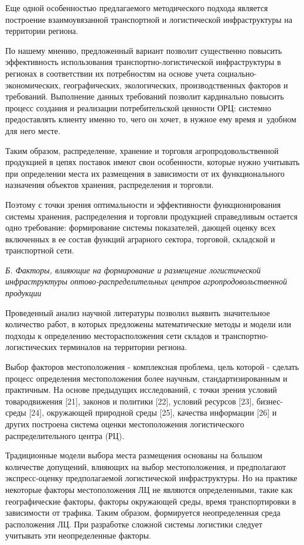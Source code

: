 Еще одной особенностью предлагаемого методического подхода является
построение взаимоувязанной транспортной и логистической инфраструктуры
на территории региона.

По нашему мнению, предложенный вариант позволит существенно повысить
эффективность использования транспортно-логистической инфраструктуры в
регионах в соответствии их потребностям на основе учета
социально-экономических, географических, экологических, производственных
факторов и требований. Выполнение данных требований позволит кардинально
повысить процесс создания и реализации потребительской ценности ОРЦ:
системно предоставлять клиенту именно то, чего он хочет, в нужное ему
время и~удобном для него месте.

Таким образом, распределение, хранение и торговля агропродовольственной
продукцией в цепях поставок имеют свои особенности, которые нужно
учитывать при определении места их размещения в зависимости от их
функционального назначения объектов хранения, распределения и торговли.

Поэтому с точки зрения оптимальности и эффективности функционирования
системы хранения, распределения и торговли продукцией справедливым
остается одно требование: формирование системы показателей, дающей
оценку всех включенных в ее состав функций аграрного сектора, торговой,
складской и транспортной сети.

\emph{Б. Факторы, влияющие на формирование и размещение логистической
инфраструктуры оптово-распределительных центров агропродовольственной
продукции}

Проведенный анализ научной литературы позволил выявить значительное
количество работ, в которых предложены математические методы и модели
или подходы к определению месторасположения сети складов и
транспортно-логистических терминалов на территории региона.

Выбор факторов местоположения - комплексная проблема, цель которой -
сделать процесс определения местоположения более научным,
стандартизированным и практичным. На основе предыдущих исследований, с
точки зрения условий товародвижения {[}21{]}, законов и политики
{[}22{]}, условий ресурсов {[}23{]}, бизнес-среды {[}24{]}, окружающей
природной среды {[}25{]}, качества информации {[}26{]} и других
построена система оценки местоположения логистического
распределительного центра (РЦ).

Традиционные модели выбора места размещения основаны на большом
количестве допущений, влияющих на выбор местоположения, и предполагают
экспресс-оценку предполагаемой логистической инфраструктуры. Но на
практике некоторые факторы местоположения ЛЦ не являются определенными,
такие как географические факторы, факторы окружающей среды, время
транспортировки в зависимости от трафика. Таким образом, формируется
неопределенная среда расположения ЛЦ. При разработке сложной системы
логистики следует учитывать эти неопределенные факторы.

